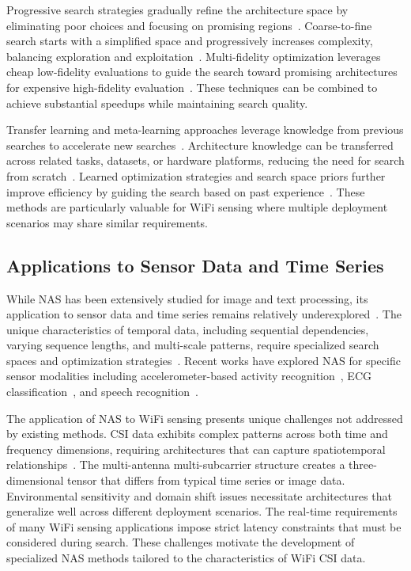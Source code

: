 \documentclass[journal]{IEEEtran}
\begin{document}
Progressive search strategies gradually refine the architecture space by eliminating poor choices and focusing on promising regions~\cite{progressive2021}. Coarse-to-fine search starts with a simplified space and progressively increases complexity, balancing exploration and exploitation~\cite{coarse2fine2022}. Multi-fidelity optimization leverages cheap low-fidelity evaluations to guide the search toward promising architectures for expensive high-fidelity evaluation~\cite{multifidelity2023}. These techniques can be combined to achieve substantial speedups while maintaining search quality.

Transfer learning and meta-learning approaches leverage knowledge from previous searches to accelerate new searches~\cite{transfer2022nas}. Architecture knowledge can be transferred across related tasks, datasets, or hardware platforms, reducing the need for search from scratch~\cite{metanas2023}. Learned optimization strategies and search space priors further improve efficiency by guiding the search based on past experience~\cite{learned2023opt}. These methods are particularly valuable for WiFi sensing where multiple deployment scenarios may share similar requirements.

\subsection{Applications to Sensor Data and Time Series}

While NAS has been extensively studied for image and text processing, its application to sensor data and time series remains relatively underexplored~\cite{tsnas2022survey}. The unique characteristics of temporal data, including sequential dependencies, varying sequence lengths, and multi-scale patterns, require specialized search spaces and optimization strategies~\cite{temporal2023nas}. Recent works have explored NAS for specific sensor modalities including accelerometer-based activity recognition~\cite{imunas2021}, ECG classification~\cite{ecgnas2022}, and speech recognition~\cite{speechnas2023}.

The application of NAS to WiFi sensing presents unique challenges not addressed by existing methods. CSI data exhibits complex patterns across both time and frequency dimensions, requiring architectures that can capture spatiotemporal relationships~\cite{csichallenges2023}. The multi-antenna multi-subcarrier structure creates a three-dimensional tensor that differs from typical time series or image data. Environmental sensitivity and domain shift issues necessitate architectures that generalize well across different deployment scenarios. The real-time requirements of many WiFi sensing applications impose strict latency constraints that must be considered during search. These challenges motivate the development of specialized NAS methods tailored to the characteristics of WiFi CSI data.
\end{document}
